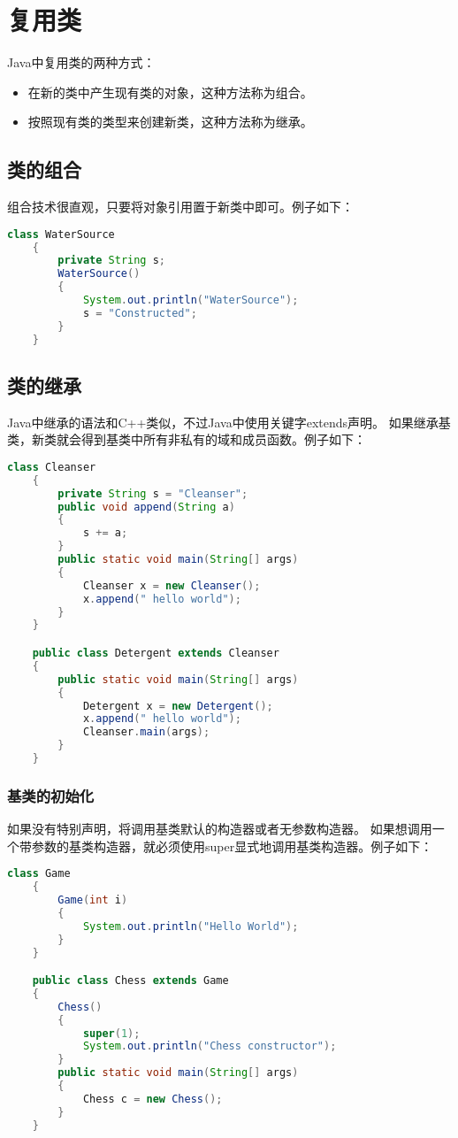 \documentclass[a4paper,left=2.5cm,right=2.5cm,11pt]{article}
\begin{document}
\tableofcontents

\clearpage

\section{复用类}
	Java中复用类的两种方式：
	\begin{itemize}
		\item 在新的类中产生现有类的对象，这种方法称为组合。
		\item 按照现有类的类型来创建新类，这种方法称为继承。
	\end{itemize}

\subsection{类的组合}
	组合技术很直观，只要将对象引用置于新类中即可。例子如下：
	\begin{lstlisting}[language = Java]
	class WaterSource
	{
		private String s;
		WaterSource()
		{
			System.out.println("WaterSource");
			s = "Constructed";
		}
	}
	\end{lstlisting}

\subsection{类的继承}
	Java中继承的语法和C++类似，不过Java中使用关键字extends声明。
	如果继承基类，新类就会得到基类中所有非私有的域和成员函数。例子如下：
	\begin{lstlisting}[language = Java]
	class Cleanser
	{
		private String s = "Cleanser";
		public void append(String a)
		{
			s += a;
		}
		public static void main(String[] args)
		{
			Cleanser x = new Cleanser();
			x.append(" hello world");
		}
	}

	public class Detergent extends Cleanser
	{
		public static void main(String[] args)
		{
			Detergent x = new Detergent();
			x.append(" hello world");
			Cleanser.main(args);
		}
	}
	\end{lstlisting}

\subsubsection{基类的初始化}
	如果没有特别声明，将调用基类默认的构造器或者无参数构造器。
	如果想调用一个带参数的基类构造器，就必须使用super显式地调用基类构造器。例子如下：
	\begin{lstlisting}[language = Java]
	class Game
	{
		Game(int i)
		{
			System.out.println("Hello World");
		}
	}

	public class Chess extends Game
	{
		Chess()
		{
			super(1);
			System.out.println("Chess constructor");
		}
		public static void main(String[] args)
		{
			Chess c = new Chess();
		}
	}
	\end{lstlisting}
\end{document}
